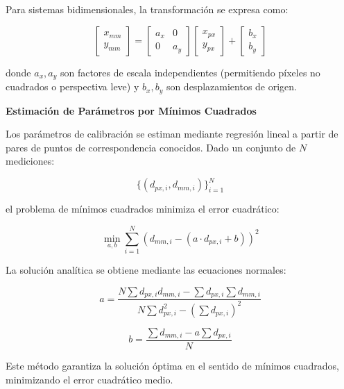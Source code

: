 Para sistemas bidimensionales, la transformación se expresa como:

\begin{equation}
\begin{bmatrix} x_{mm} \\ y_{mm} \end{bmatrix} = \begin{bmatrix} a_x & 0 \\ 0 & a_y \end{bmatrix} \begin{bmatrix} x_{px} \\ y_{px} \end{bmatrix} + \begin{bmatrix} b_x \\ b_y \end{bmatrix}
\end{equation}

donde $a_x, a_y$ son factores de escala independientes (permitiendo píxeles no cuadrados o perspectiva leve) y $b_x, b_y$ son desplazamientos de origen.

\textbf{Estimación de Parámetros por Mínimos Cuadrados}

Los parámetros de calibración se estiman mediante regresión lineal a partir de pares de puntos de correspondencia conocidos. Dado un conjunto de $N$ mediciones:

\begin{equation}
\{(d_{px,i}, d_{mm,i})\}_{i=1}^{N}
\end{equation}

el problema de mínimos cuadrados minimiza el error cuadrático:

\begin{equation}
\min_{a,b} \sum_{i=1}^{N} (d_{mm,i} - (a \cdot d_{px,i} + b))^2
\end{equation}

La solución analítica se obtiene mediante las ecuaciones normales:

\begin{equation}
a = \frac{N\sum d_{px,i}d_{mm,i} - \sum d_{px,i}\sum d_{mm,i}}{N\sum d_{px,i}^2 - (\sum d_{px,i})^2}
\end{equation}

\begin{equation}
b = \frac{\sum d_{mm,i} - a\sum d_{px,i}}{N}
\end{equation}

Este método garantiza la solución óptima en el sentido de mínimos cuadrados, minimizando el error cuadrático medio.

